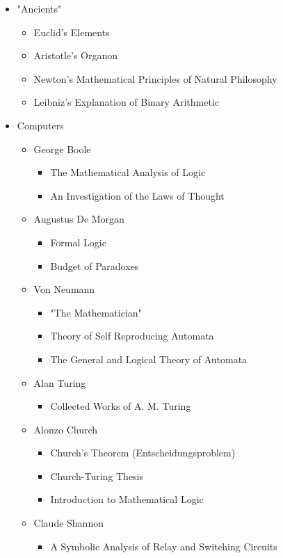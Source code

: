 \documentclass{article}
\begin{document}
\begin{itemize}
	\item "Ancients"
	\begin{itemize}
		\item Euclid's Elements
		\item Aristotle's Organon
		\item Newton's Mathematical Principles of Natural Philosophy
		\item Leibniz's Explanation of Binary Arithmetic
	\end{itemize}
	\item Computers
	\begin{itemize}
		\item George Boole
		\begin{itemize}
			\item The Mathematical Analysis of Logic
			\item An Investigation of the Laws of Thought
		\end{itemize}
		\item Augustus De Morgan
		\begin{itemize}
			\item Formal Logic
			\item Budget of Paradoxes
		\end{itemize}
		\item Von Neumann
		\begin{itemize}
			\item "The Mathematician"
			\item Theory of Self Reproducing Automata
			\item The General and Logical Theory of Automata
		\end{itemize}
		\item Alan Turing
		\begin{itemize}
			\item Collected Works of A. M. Turing
		\end{itemize}
		\item Alonzo Church
		\begin{itemize}
			\item Church's Theorem (Entscheidungsproblem)
			\item Church-Turing Thesis
			\item Introduction to Mathematical Logic
		\end{itemize}
		\item Claude Shannon
		\begin{itemize}
			\item A Symbolic Analysis of Relay and Switching Circuits

\end{itemize}
\end{itemize}
\end{itemize}
\end{document}

